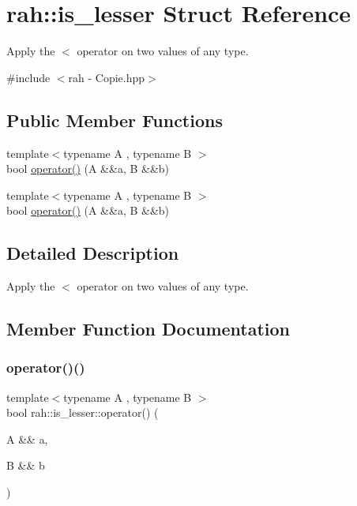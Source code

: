 \hypertarget{structrah_1_1is__lesser}{}\section{rah\+::is\+\_\+lesser Struct Reference}
\label{structrah_1_1is__lesser}


Apply the \textquotesingle{}$<$\textquotesingle{} operator on two values of any type.  




{\ttfamily \#include $<$rah -\/ Copie.\+hpp$>$}

\subsection*{Public Member Functions}
\begin{DoxyCompactItemize}
\item 
{\footnotesize template$<$typename A , typename B $>$ }\\bool \mbox{\hyperlink{structrah_1_1is__lesser_a250017bbf05b42571b4846f3c0695a8d}{operator()}} (A \&\&a, B \&\&b)
\item 
{\footnotesize template$<$typename A , typename B $>$ }\\bool \mbox{\hyperlink{structrah_1_1is__lesser_a250017bbf05b42571b4846f3c0695a8d}{operator()}} (A \&\&a, B \&\&b)
\end{DoxyCompactItemize}


\subsection{Detailed Description}
Apply the \textquotesingle{}$<$\textquotesingle{} operator on two values of any type. 

\subsection{Member Function Documentation}
\mbox{\label{structrah_1_1is__lesser_a250017bbf05b42571b4846f3c0695a8d}} 
\subsubsection{\texorpdfstring{operator()()}{operator()()}\hspace{0.1cm}{\footnotesize\ttfamily [1/2]}}
{\footnotesize\ttfamily template$<$typename A , typename B $>$ \\
bool rah\+::is\+\_\+lesser\+::operator() (\begin{DoxyParamCaption}\item[{A \&\&}]{a,  }\item[{B \&\&}]{b }\end{DoxyParamCaption})\hspace{0.3cm}{\ttfamily [inline]}}

